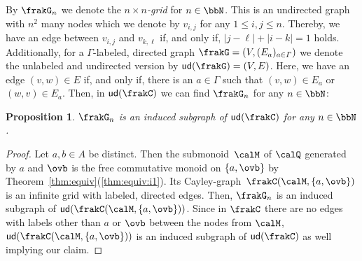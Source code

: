 \documentclass[a4paper,numberwithinsect,USenglish]{lipics-v2018}
\theoremstyle{plain}
\newtheorem{proposition}[theorem]{Proposition}
\theoremstyle{remark}
\newcommand{\Qx}{\calQ}
\newcommand{\cayley}[2]{\frakC(#1,#2)}
\newcommand{\cQ}{\frakC}
\newcommand{\ud}[1]{\mathsf{ud}(#1)}
\begin{document}
By $\frakG_n$ we denote the \emph{$n\times n$-grid} for $n\in\bbN$. This is an undirected graph with $n^2$ many nodes which we denote by $v_{i,j}$ for any $1\leq i,j\leq n$. Thereby, we have an edge between $v_{i,j}$ and $v_{k,\ell}$ if, and only if, $|j-\ell|+|i-k|=1$ holds.
Additionally, for a $\varGamma$-labeled, directed graph $\frakG=(V,(E_a)_{a\in\varGamma})$ we denote the unlabeled and undirected version by $\ud{\frakG}=(V,E)$. Here, we have an edge $(v,w)\in E$ if, and only if, there is an $a\in\varGamma$ such that $(v,w)\in E_a$ or $(w,v)\in E_a$. Then, in $\ud{\cQ}$ we can find $\frakG_n$ for any $n\in\bbN$:

\begin{proposition}\label{prop:grid}
	$\frakG_n$ is an induced subgraph of $\ud{\cQ}$ for any $n\in\bbN$.
\end{proposition}
\begin{proof}
	Let $a,b\in A$ be distinct. Then the submonoid~$\calM$ of $\Qx$ generated by $a$ and $\ovb$ is the free commutative monoid on $\{a,\ovb\}$ by Theorem~\ref{thm:equiv}(\ref{thm:equiv:i1}). Its Cayley-graph~$\cayley{\calM}{\{a,\ovb\}}$ is an infinite grid with labeled, directed edges. %
	Then, $\frakG_n$ is an induced subgraph of $\ud{\cayley{\calM}{\{a,\ovb\}}}$. Since in $\cQ$ there are no edges with labels other than $a$ or $\ovb$ between the nodes from $\calM$, $\ud{\cayley{\calM}{\{a,\ovb\}}}$ is an induced subgraph of $\ud{\cQ}$ as well implying our claim.
\end{proof}
\end{document}
